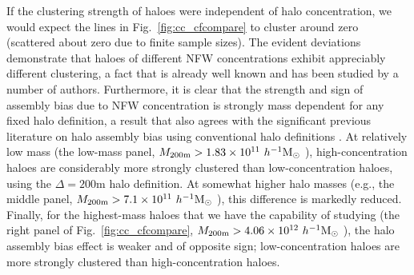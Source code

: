 \documentclass[usenatbib,fleqn]{mnras}
\begin{document}
If the clustering strength of haloes were independent of halo concentration, we would expect the lines in Fig.~\ref{fig:cc_cfcompare} to cluster around zero (scattered about zero due to finite sample sizes). The evident deviations demonstrate that haloes of different NFW concentrations exhibit appreciably different clustering, a fact that is already well known and has been studied by a number of authors. Furthermore, it is clear that the strength and sign of assembly bias due to NFW concentration is 
strongly mass dependent for any fixed halo definition, a result that also agrees with the significant previous literature on halo assembly bias using conventional halo definitions \citep{wechsler_etal02, gao_etal05, zentner07, wechsler_etal06, harker_etal06, croton_etal07, dalal_etal08, mao_etal15, sunayama_etal16}. At relatively low mass (the low-mass panel, $M_{200\text{m}} > 1.83 \times 10^{11} \ h^{-1}\mathrm{M}_{\odot}~$), high-concentration haloes are considerably more strongly clustered than low-concentration haloes, using the $\Delta = 200$m halo definition. At somewhat higher halo masses (e.g., the middle panel, $M_{200\text{m}} > 7.1 \times 10^{11} \ h^{-1}\mathrm{M}_{\odot}~$), this difference is markedly reduced. Finally, for the highest-mass haloes that we have the capability of studying (the right panel of Fig.~\ref{fig:cc_cfcompare}, $M_{200\text{m}} > 4.06 \times 10^{12} \ h^{-1}\mathrm{M}_{\odot}~$), the halo assembly bias effect is weaker and of opposite sign; low-concentration haloes are more strongly clustered than high-concentration haloes.
\end{document}
